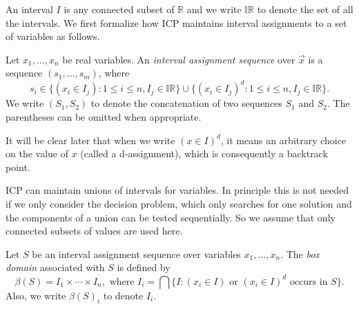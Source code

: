 \documentclass{llncs}
\begin{document}
An interval $I$ is any connected subset of
$\mathbb{R}$ and we write $\mathbb{IR}$ to denote the set of all the intervals.
We first formalize how ICP maintains interval assignments to a set of variables
as follows.
\begin{definition}
Let $x_1,...,x_n$ be real variables. An {\em interval assignment sequence} over
$\vec x$ is a sequence $(s_1,...,s_m)$, where
$$s_i\in \{(x_i\in I_j): 1\leq i\leq n, I_j\in
\mathbb{IR}\}\cup\{(x_i\in I_j)^d: 1\leq i\leq n, I_j\in
\mathbb{IR}\}.
$$
We write $(S_1, S_2)$ to denote the concatenation of two sequences $S_1$ and
$S_2$. The parentheses can be omitted when appropriate.
\end{definition}
It will be clear later that when we write $(x\in I)^d$, it means an arbitrary
choice on the value of $x$ (called a d-assignment), which is consequently a backtrack point.
\begin{remark}
ICP can maintain unions of intervals for variables. In principle this is not
needed if we only consider the decision problem, which only searches for
one solution and the components of a union can be tested sequentially. So we
assume that only connected subsets of values are used here.
\end{remark}

\begin{definition}
Let $S$ be an interval assignment sequence over variables $x_1,...,x_n$. The
{\em box
domain} associated with $S$ is defined by
$$\beta(S) = I_1\times\cdots \times I_n, \mbox{ where }I_i = \bigcap\{ I:
(x_i\in
I)\mbox{ or } (x_i\in I)^d \mbox{ occurs in } S\}.$$
Also, we write $\beta(S)_i$ to denote $I_i$.
\end{definition}
\end{document}

